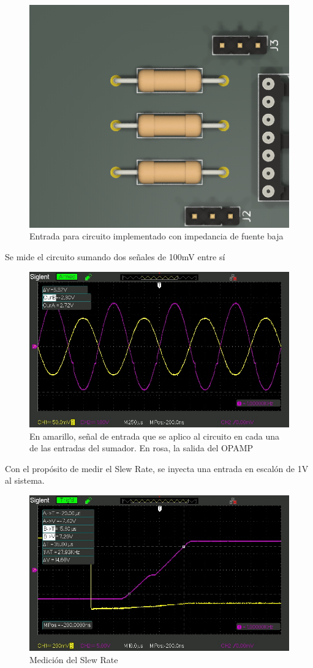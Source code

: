 \begin{figure}[H]
    \centering
    \includegraphics[width=0.5\linewidth]{Entrada para circuito implementado con impedancia de fuente baja.png}
    \caption{Entrada para circuito implementado con impedancia de fuente baja}
    \label{fig:enter-label}
\end{figure}

Se mide el circuito sumando dos señales de 100mV entre sí

\begin{figure}[H]
    \centering
    \includegraphics[width=0.75\linewidth]{img/SDS00014.jpg}
    \caption{En amarillo, señal de entrada que se aplico al circuito en cada una de las entradas del sumador. En rosa, la salida del OPAMP}
    \label{fig:enter-label}
\end{figure}

Con el propósito de medir el Slew Rate, se inyecta una entrada en escalón de 1V al sistema.

\begin{figure}[H]
    \centering
    \includegraphics[width=0.75\linewidth]{SDS00012.jpg}
    \caption{Medición del Slew Rate}
    \label{fig:enter-label}
\end{figure}


